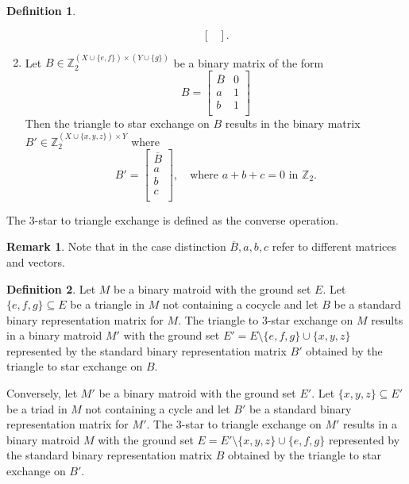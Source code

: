 \documentclass{article}
\theoremstyle{definition}
\newtheorem{definition}{Definition}
\newtheorem{remark}{Remark}
\begin{document}
\begin{definition}
\begin{enumerate}
\[\begin{bmatrix}
            \end{bmatrix}.
        \]
        \item Let $B \in \mathbb{Z}_{2}^{(X \cup \{e, f\}) \times (Y \cup \{g\})}$ be a binary matrix of the form
        \[
            B = \begin{bmatrix}
                \overline{B} & 0 \\
                a & 1 \\
                b & 1 \\
            \end{bmatrix}
        \]
        Then the triangle to star exchange on $B$ results in the binary matrix $B' \in \mathbb{Z}_{2}^{(X \cup \{x, y, z\}) \times Y}$ where
        \[
            B' = \begin{bmatrix}
                \overline{B} \\
                a \\
                b \\
                c \\
            \end{bmatrix}
            , \quad
            \text{where $a + b + c = 0$ in $\mathbb{Z}_{2}$.}
        \]
    \end{enumerate}
    The 3-star to triangle exchange is defined as the converse operation.
\end{definition}

\begin{remark}
    Note that in the case distinction $\overline{B}, a, b, c$ refer to different matrices and vectors.
\end{remark}

\begin{definition}
    Let $M$ be a binary matroid with the ground set $E$. Let $\{e, f, g\} \subseteq E$ be a triangle in $M$ not containing a cocycle and let $B$ be a standard binary representation matrix for $M$. The triangle to 3-star exchange on $M$ results in a binary matroid $M'$ with the ground set $E' = E \setminus \{e, f, g\} \cup \{x, y, z\}$ represented by the standard binary representation matrix $B'$ obtained by the triangle to star exchange on $B$.

    Conversely, let $M'$ be a binary matroid with the ground set $E'$. Let $\{x, y, z\} \subseteq E'$ be a triad in $M$ not containing a cycle and let $B'$ be a standard binary representation matrix for $M'$. The 3-star to triangle exchange on $M'$ results in a binary matroid $M$ with the ground set $E = E' \setminus \{x, y, z\} \cup \{e, f, g\}$ represented by the standard binary representation matrix $B$ obtained by the triangle to star exchange on $B'$.
\end{definition}
\end{document}
